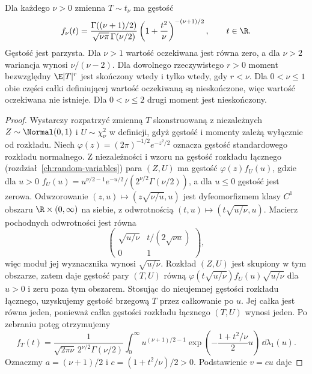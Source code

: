 \begin{twierdzenie}
Dla każdego $\nu>0$ zmienna $T\sim t_\nu$ ma gęstość
\begin{equation}\label{eq:student}
f_\nu(t)=
\frac{\Gamma((\nu+1)/2)}{\sqrt{\nu\pi}\,\Gamma(\nu/2)}
\left(1+\frac{t^2}{\nu}\right)^{-(\nu+1)/2},
\qquad t\in\R.
\end{equation}
Gęstość jest parzysta. Dla $\nu>1$ wartość oczekiwana
jest równa zero, a dla $\nu>2$ wariancja wynosi $\nu/(\nu-2)$.
Dla dowolnego rzeczywistego $r>0$ moment bezwzględny
$\E|T|^r$ jest skończony wtedy i tylko wtedy, gdy $r<\nu$.
Dla $0<\nu\leq1$ obie części całki definiującej wartość
oczekiwaną są nieskończone, więc wartość oczekiwana nie
istnieje. Dla $0<\nu\leq2$ drugi moment jest nieskończony.
\end{twierdzenie}
\begin{proof}
Wystarczy rozpatrzyć zmienną $T$ skonstruowaną z niezależnych
$Z\sim\Normal(0,1)$ i $U\sim\chi_\nu^2$ w definicji,
gdyż gęstość i momenty zależą wyłącznie od rozkładu.
Niech $\varphi(z)=(2\pi)^{-1/2}e^{-z^2/2}$ oznacza
gęstość standardowego rozkładu normalnego.
Z niezależności i wzoru na gęstość rozkładu łącznego
(rozdział~\ref{ch:random-variables}) para $(Z,U)$
ma gęstość $\varphi(z)f_U(u)$, gdzie dla $u>0$
$f_U(u)=u^{\nu/2-1}e^{-u/2}/(2^{\nu/2}\Gamma(\nu/2))$,
a dla $u\leq0$ gęstość jest zerowa.
Odwzorowanie $(z,u)\mapsto(z\sqrt{\nu/u},u)$
jest dyfeomorfizmem klasy $C^1$ obszaru
$\R\times(0,\infty)$ na siebie, z odwrotnością
$(t,u)\mapsto(t\sqrt{u/\nu},u)$.
Macierz pochodnych odwrotności jest równa
\[
\begin{pmatrix}
\sqrt{u/\nu}&t/(2\sqrt{\nu u})\\
0&1
\end{pmatrix},
\]
więc moduł jej wyznacznika wynosi $\sqrt{u/\nu}$.
Rozkład $(Z,U)$ jest skupiony w tym obszarze,
zatem 
daje gęstość pary $(T,U)$ równą
$\varphi(t\sqrt{u/\nu})f_U(u)\sqrt{u/\nu}$ dla $u>0$
i zeru poza tym obszarem.
Stosując 
do nieujemnej gęstości rozkładu łącznego, uzyskujemy
gęstość brzegową $T$ przez całkowanie po $u$.
Jej całka jest równa jeden, ponieważ całka gęstości
rozkładu łącznego $(T,U)$ wynosi jeden.
Po zebraniu potęg otrzymujemy
\[
f_T(t)=\frac1{\sqrt{2\pi\nu}\,2^{\nu/2}\Gamma(\nu/2)}
\int_0^\infty u^{(\nu+1)/2-1}
\exp\!\left(-\frac{1+t^2/\nu}{2}u\right)
\,\dd\lambda_1(u).
\]
Oznaczmy $a=(\nu+1)/2$ i $c=(1+t^2/\nu)/2>0$.
Podstawienie $v=cu$ daje

\end{proof}
